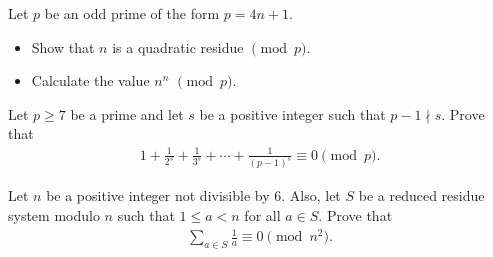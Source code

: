 \documentclass[12pt]{subfile}
\begin{document}
		\begin{problem}
			Let $p$ be an odd prime of the form $p=4n+1$. 
			\begin{itemize}
				\item Show that $n$ is a quadratic residue $\pmod{p}$.  
				\item Calculate the value $n^{n}$  $\pmod{p}$.
			\end{itemize}
		\end{problem}
		
		\begin{problem} %
			Let $p \geq 7$ be a prime and let $s$ be a positive integer such that $p-1 \nmid s$. Prove that 
			\begin{align*}
				1 + \frac {1}{2^s} + \frac {1}{3^s} + \cdots + \frac {1}{(p - 1)^s} \equiv 0 \pmod p.
			\end{align*}
		\end{problem}
		
		\begin{problem} %
			Let $n$ be a positive integer not divisible by $6$. Also, let $S$ be a reduced residue system modulo $n$ such that $1 \leq a <n$ for all $a \in S$. Prove that
			\begin{align*}
			\sum_{a \in S} \frac{1}{a} \equiv 0 \pmod{n^2}.
			\end{align*}
		\end{problem}
	
	
			
\end{document}
